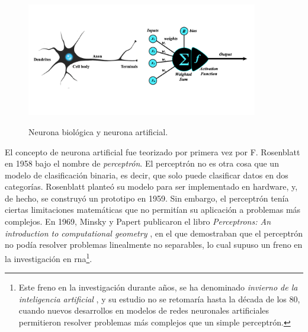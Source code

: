 \begin{figure}[H]
    \caption[Neurona biológica y neurona artificial]{Neurona biológica y neurona artificial.}
    \centering
    \includegraphics[width=0.9\textwidth]{./figuras/perceptron_with_neuron.png}
    \label{fig:neurona_artificial_natural}
\end{figure}

El concepto de neurona artificial fue teorizado por primera vez por F. Rosenblatt en 1958 \citep{rothmanTransformersNaturalLanguage2021} bajo el nombre de \emph{perceptrón}. El perceptrón no es otra cosa que un modelo de clasificación binaria, es decir, que solo puede clasificar datos en dos categorías. Rosenblatt planteó su modelo para ser implementado en hardware, y, de hecho, se construyó un prototipo en 1959. Sin embargo, el perceptrón tenía ciertas limitaciones matemáticas que no permitían su aplicación a problemas más complejos. En 1969, Minsky y Papert publicaron el libro \emph{Perceptrons: An introduction to computational geometry} \citep{minsky1969perceptrons}, en el que demostraban que el perceptrón no podía resolver problemas linealmente no separables, lo cual supuso un freno en la investigación en \gls{rna}\footnote{Este freno en la investigación durante años, se ha denominado \emph{invierno de la inteligencia artificial} \citep{InviernoIA2023}, y su estudio no se retomaría hasta la década de los 80, cuando nuevos desarrollos en modelos de redes neuronales artificiales permitieron resolver problemas más complejos que un simple perceptrón.}.


